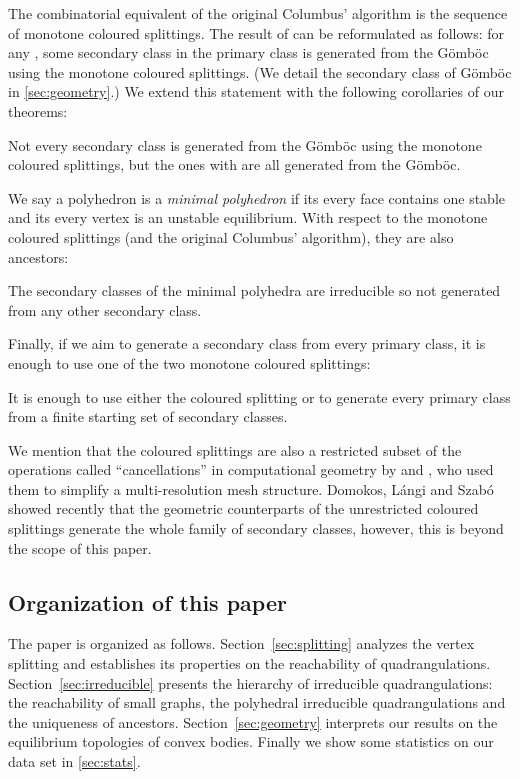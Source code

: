 \documentclass[]{article}
\newcommand{\Gomboc}{Gömböc\xspace}
\begin{document}
The combinatorial equivalent of the original Columbus' algorithm is the sequence of monotone coloured splittings.
The result of \cite{Domokos2006} can be reformulated as follows: for any , some secondary class in the primary class  is generated from the \Gomboc using the monotone coloured splittings.
(We detail the secondary class of \Gomboc in \autoref{sec:geometry}.)
We extend this statement with the following corollaries of our theorems:
\begin{coro}
  \label{coro:irreduc}
  Not every secondary class is generated from the \Gomboc using the monotone coloured splittings, but the ones with  are all generated from the \Gomboc.
\end{coro}
We say a polyhedron is a \emph{minimal polyhedron} if its every face contains one stable and its every vertex is an unstable equilibrium.
With respect to the monotone coloured splittings (and the original Columbus' algorithm), they are also ancestors:
\begin{coro}
  \label{coro:minpol}
  The secondary classes of the minimal polyhedra are irreducible so not generated from any other secondary class.
\end{coro}
Finally, if we aim to generate a secondary class from every primary class, it is enough to use one of the two monotone coloured splittings:
\begin{coro}
  \label{coro:restr}
  It is enough to use either the coloured splitting  or  to generate every primary class from a finite starting set of secondary classes.
\end{coro}


We mention that the coloured splittings are also a restricted subset of the operations called ``cancellations'' in computational geometry by \citet{Edelsbrunner2001} and \citet[Fig.~7.3]{Bremer2004}, who used them to simplify a multi-resolution mesh structure.
Domokos, Lángi and Szabó \cite{Domokos2012} showed recently that the geometric counterparts of the unrestricted coloured splittings generate the whole family of secondary classes, however, this is beyond the scope of this paper.


\subsection{Organization of this paper}

The paper is organized as follows.
Section~\ref*{sec:splitting} analyzes the vertex splitting and establishes its properties on the reachability of quadrangulations.
Section~\ref*{sec:irreducible} presents the hierarchy of irreducible quadrangulations: the reachability of small graphs, the polyhedral irreducible quadrangulations and the uniqueness of ancestors.
Section~\ref*{sec:geometry} interprets our results on the equilibrium topologies of convex bodies.
Finally we show some statistics on our data set in \autoref*{sec:stats}.
\end{document}
